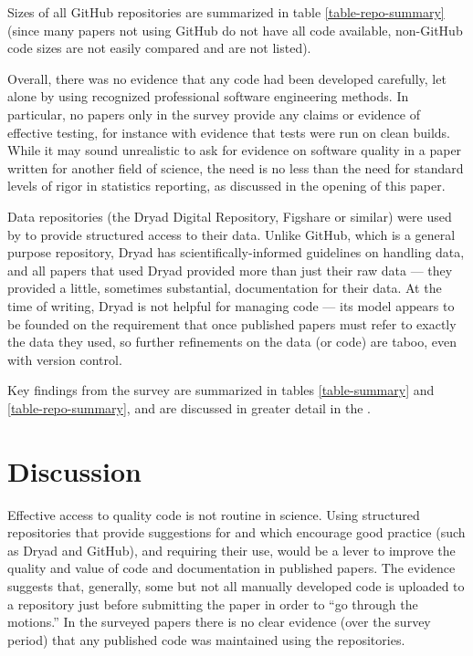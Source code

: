 Sizes of all GitHub repositories are summarized in table \ref{table-repo-summary} (since many papers not using GitHub do not have all code available, non-GitHub code sizes are not easily compared and are not listed). 

Overall, there was no evidence that any code had been developed carefully, {let alone by using recognized professional software engineering methods}. In particular, 
\ifnum {}
no papers
\else only 
\fi in the survey provide any claims or evidence of effective testing, for instance with evidence that tests were run on clean builds. {While it may sound unrealistic to ask for evidence on software quality in a paper written for another field of science, the need is no less than the need for standard levels of rigor in statistics reporting, as discussed in the opening of this paper.}

Data repositories (the Dryad Digital Repository, Figshare or similar) were used by  to provide structured access to their data. Unlike GitHub, which is a general purpose repository, Dryad has scientifically-informed guidelines on handling data, and all papers that used Dryad provided more than just their raw data --- they provided a little, sometimes substantial, documentation for their data. At the time of writing, Dryad is not helpful for managing code --- its model appears to be founded on the requirement that once published papers must refer to exactly the data they used, so further refinements on the data (or code) are taboo, even with version control.

Key findings from the survey are summarized in tables \ref{table-summary} and \ref{table-repo-summary}, and are discussed in greater detail in the \supplement. 

\section{Discussion}
Effective access to quality code is not routine in science. Using structured repositories that provide suggestions for and which encourage good practice (such as Dryad and GitHub), and requiring their use, would be a lever to improve the quality and value of code and documentation in published papers. The evidence suggests that, generally, some but not all manually developed code is uploaded to a repository just before submitting the paper in order to ``go through the motions.'' In the surveyed papers there is no clear evidence (over the survey period) that any published code was maintained using the repositories.

